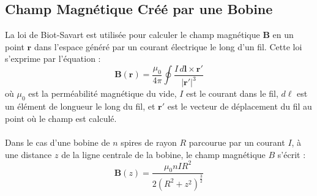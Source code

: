 \documentclass{article}
\begin{document}
\subsection{Champ Magnétique Créé par une Bobine}
    La loi de Biot-Savart \cite{ref2} est utilisée pour calculer le champ magnétique $\mathbf{B}$ en un point $\mathbf{r}$ dans l'espace généré par un courant électrique le long d'un fil. Cette loi s'exprime par l'équation :
    \begin{equation}
    \mathbf{B}(\mathbf{r}) = \frac{\mu_0}{4\pi} \oint \frac{I \, d\mathbf{l} \times \mathbf{r'}}{| \mathbf{r'}|^3}\label{eq:Boit_Savart}
    \end{equation}
    où $\mu_0$ est la perméabilité magnétique du vide, $I$ est le courant dans le fil, $d\boldsymbol{\ell}$ est un élément de longueur le long du fil, et $\mathbf{r'}$ est le vecteur de déplacement du fil au point où le champ est calculé.\\\\
    Dans le cas d'une bobine de $n$ spires de rayon $R$ parcourue par un courant $I$, à une distance $z$ de la ligne centrale de la bobine, le champ magnétique $B$ s'écrit :
    \begin{equation}
       \mathbf{B}(z) = \frac{\mu_0nIR^{2}}{2(R^{2}+z^{2})^{\frac{3}{2}}}\label{eq:Equation2}
    \end{equation}
\end{document}
